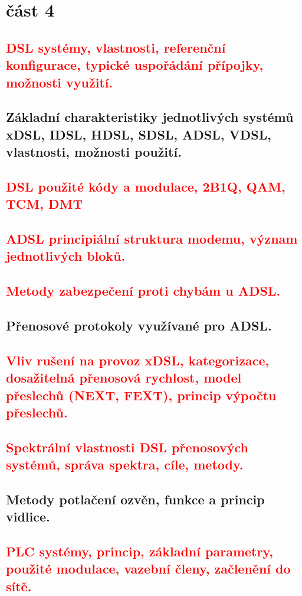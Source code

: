 \section{část 4}
\subsection{\textcolor{red}{DSL systémy, vlastnosti, referenční konfigurace, typické uspořádání přípojky, možnosti využití.}}
\subsection{Základní charakteristiky jednotlivých systémů xDSL, IDSL, HDSL, SDSL, ADSL, VDSL, vlastnosti, možnosti použití.}
\subsection{\textcolor{red}{DSL použité kódy a modulace, 2B1Q, QAM, TCM, DMT}}
\subsection{\textcolor{red}{ADSL principiální struktura modemu, význam jednotlivých bloků.}}
\subsection{\textcolor{red}{Metody zabezpečení proti chybám u ADSL.}}
\subsection{Přenosové protokoly využívané pro ADSL.}
\subsection{\textcolor{red}{Vliv rušení na provoz xDSL, kategorizace, dosažitelná přenosová rychlost, model přeslechů (NEXT, FEXT), princip výpočtu přeslechů.}}
\subsection{\textcolor{red}{Spektrální vlastnosti DSL přenosových systémů, správa spektra, cíle, metody.}}
\subsection{Metody potlačení ozvěn, funkce a princip vidlice.}
\subsection{\textcolor{red}{PLC systémy, princip, základní parametry, použité modulace, vazební členy, začlenění do sítě.}}